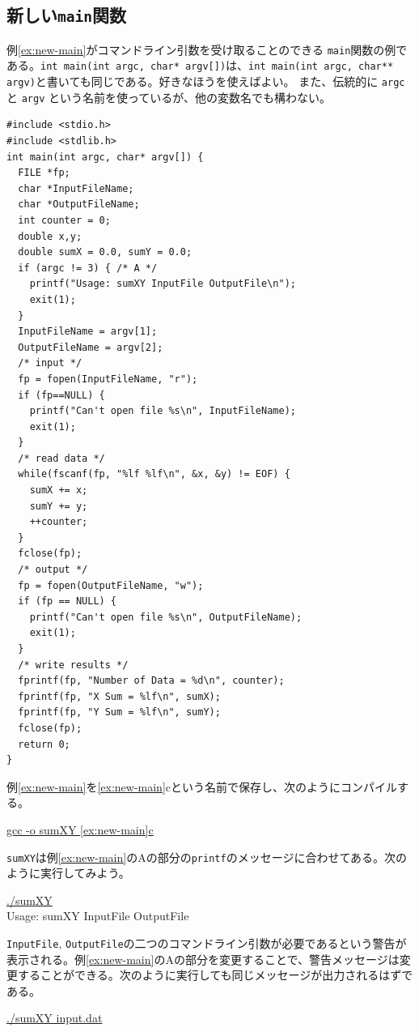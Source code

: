 \subsection{新しい{\tt main}関数}

例\ref{ex:new-main}がコマンドライン引数を受け取ることのできる \verb|main|関数の例である。{\tt int main(int argc, char* argv[])}は、{\tt int main(int argc, char** argv)}と書いても同じである。好きなほうを使えばよい。
また、伝統的に \verb|argc| と \verb|argv| という名前を使っているが、他の変数名でも構わない。
\begin{reidai}\label{ex:new-main}
\begin{verbatim}
#include <stdio.h>
#include <stdlib.h>
int main(int argc, char* argv[]) {
  FILE *fp;
  char *InputFileName;
  char *OutputFileName;
  int counter = 0;
  double x,y;
  double sumX = 0.0, sumY = 0.0;
  if (argc != 3) { /* A */
    printf("Usage: sumXY InputFile OutputFile\n");
    exit(1);
  }
  InputFileName = argv[1];
  OutputFileName = argv[2];
  /* input */
  fp = fopen(InputFileName, "r");
  if (fp==NULL) {
    printf("Can't open file %s\n", InputFileName);
    exit(1);
  }
  /* read data */
  while(fscanf(fp, "%lf %lf\n", &x, &y) != EOF) {
    sumX += x;
    sumY += y;
    ++counter;
  }
  fclose(fp);
  /* output */
  fp = fopen(OutputFileName, "w");
  if (fp == NULL) {
    printf("Can't open file %s\n", OutputFileName);
    exit(1);
  }
  /* write results */
  fprintf(fp, "Number of Data = %d\n", counter);
  fprintf(fp, "X Sum = %lf\n", sumX);
  fprintf(fp, "Y Sum = %lf\n", sumY);
  fclose(fp);
  return 0;
}
\end{verbatim}
\end{reidai} \noindent
例\ref{ex:new-main}を\ref{ex:new-main}cという名前で保存し、次のようにコンパイルする。
\begin{commandline2}
\prompt \underline{gcc -o sumXY \ref{ex:new-main}c}
\end{commandline2} \noindent
\verb|sumXY|は例\ref{ex:new-main}のAの部分の\verb|printf|のメッセージに合わせてある。次のように実行してみよう。
\begin{commandline2}
\prompt \underline{./sumXY}\\
Usage: sumXY InputFile OutputFile
\end{commandline2} \noindent
{\tt InputFile}, {\tt OutputFile}の二つのコマンドライン引数が必要であるという警告が表示される。例\ref{ex:new-main}のAの部分を変更することで、警告メッセージは変更することができる。次のように実行しても同じメッセージが出力されるはずである。
\begin{commandline2}
\prompt \underline{./sumXY input.dat}
\end{commandline2} \noindent
